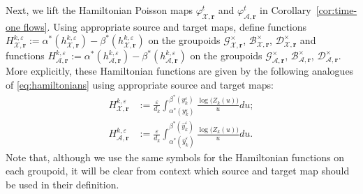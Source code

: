 \documentclass{amsart}
\numberwithin{equation}{section}
\newcommand{\bfr}{{\boldsymbol{r}}}
\newcommand{\cA}{\mathcal{A}}
\newcommand{\cB}{\mathcal{B}}
\newcommand{\cD}{\mathcal{D}}
\newcommand{\cG}{\mathcal{G}}
\newcommand{\cX}{\mathcal{X}}
\begin{document}
Next, we lift the Hamiltonian Poisson maps $\varphi_{\cX,\bfr}^t$ and $\varphi_{\cA,\bfr}^t$ in Corollary~\ref{cor:time-one flows}.
Using appropriate source and target maps, define functions $H_{\cX,\bfr}^{k,\varepsilon}:=\alpha^*(h_{\cX,\bfr}^{k,\varepsilon})-\beta^*(h_{\cX,\bfr}^{k,\varepsilon})$ on the groupoids $\cG^\times_{\cX,\bfr}$, $\cB^\times_{\cX,\bfr}$, $\cD^\times_{\cX,\bfr}$ and functions $H_{\cA,\bfr}^{k,\varepsilon}:=\alpha^*(h_{\cA,\bfr}^{k,\varepsilon})-\beta^*(h_{\cA,\bfr}^{k,\varepsilon})$ on the groupoids $\cG^\times_{\cA,\bfr}$, $\cB^\times_{\cA,\bfr}$, $\cD^\times_{\cA,\bfr}$.
More explicitly, these Hamiltonian functions are given by the following analogues of \eqref{eq:hamiltonians} using appropriate source and target maps:
\begin{align}
  \label{eq:X hamiltonian}
  H_{\cX,\bfr}^{k,\varepsilon}&:=\frac{\varepsilon}{d_k}\int_{\alpha^*(y_k^\varepsilon)}^{\beta^*(y_k^\varepsilon)} \frac{\log\big(Z_k(u)\big)}{u}du;\\
  \label{eq:A hamiltonian}
  H_{\cA,\bfr}^{k,\varepsilon}&:=\frac{\varepsilon}{d_k}\int_{\alpha^*(\hat y_k^\varepsilon)}^{\beta^*(\hat y_k^\varepsilon)} \frac{\log\big(Z_k(u)\big)}{u}du.
\end{align}
Note that, although we use the same symbols for the Hamiltonian functions on each groupoid, it will be clear from context which source and target map should be used in their definition.
\end{document}
